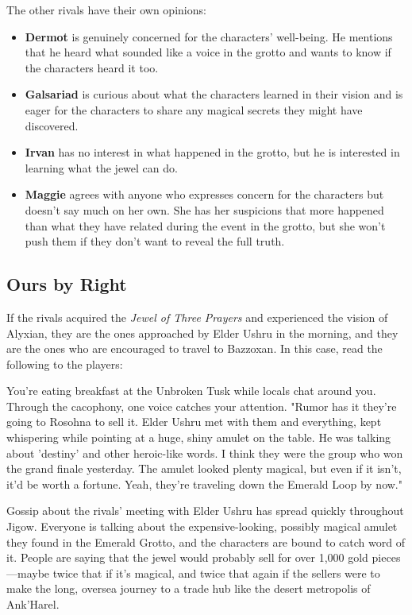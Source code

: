\documentclass[a4paper, 11pt, bg=full, twocolumn, nooutline]{dndbook}
\begin{document}
The other rivals have their own opinions:

\begin{itemize}
\item \textbf{Dermot} is genuinely concerned for the characters' well-being. He mentions that he heard what sounded like a voice in the grotto and wants to know if the characters heard it too.
\item \textbf{Galsariad} is curious about what the characters learned in their vision and is eager for the characters to share any magical secrets they might have discovered.
\item \textbf{Irvan} has no interest in what happened in the grotto, but he is interested in learning what the jewel can do.
\item \textbf{Maggie} agrees with anyone who expresses concern for the characters but doesn't say much on her own. She has her suspicions that more happened than what they have related during the event in the grotto, but she won't push them if they don't want to reveal the full truth.
\end{itemize}

\subsection{Ours by Right}

If the rivals acquired the \textit{Jewel of Three Prayers} and experienced the vision of Alyxian, they are the ones approached by Elder Ushru in the morning, and they are the ones who are encouraged to travel to Bazzoxan. In this case, read the following to the players:

\begin{DndReadAloud}
You're eating breakfast at the Unbroken Tusk while locals chat around you. Through the cacophony, one voice catches your attention.
"Rumor has it they're going to Rosohna to sell it. Elder Ushru met with them and everything, kept whispering while pointing at a huge, shiny amulet on the table. He was talking about 'destiny' and other heroic-like words. I think they were the group who won the grand finale yesterday. The amulet looked plenty magical, but even if it isn't, it'd be worth a fortune. Yeah, they're traveling down the Emerald Loop by now."
\end{DndReadAloud}

Gossip about the rivals' meeting with Elder Ushru has spread quickly throughout Jigow. Everyone is talking about the expensive-looking, possibly magical amulet they found in the Emerald Grotto, and the characters are bound to catch word of it. People are saying that the jewel would probably sell for over 1,000 gold pieces---maybe twice that if it's magical, and twice that again if the sellers were to make the long, oversea journey to a trade hub like the desert metropolis of Ank'Harel.
\end{document}
